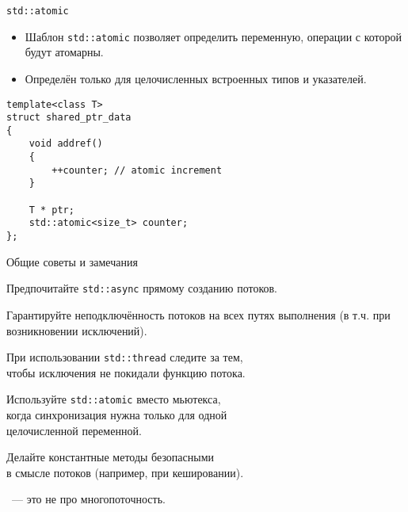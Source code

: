 \documentclass[aspectration=1610,t]{beamer}
\begin{document}
\begin{frame}[fragile]{\texttt{std::atomic}}
    \begin{itemize}
        \item Шаблон \texttt{std::atomic} позволяет определить переменную,
            операции с которой будут атомарны.

        \item Определён только для целочисленных встроенных типов и указателей.
    \end{itemize}

\begin{lstlisting}
template<class T>
struct shared_ptr_data 
{
    void addref() 
    {
        ++counter; // atomic increment
    }
    
    T * ptr;
    std::atomic<size_t> counter;
};
\end{lstlisting}
\end{frame}

\begin{frame}{Общие советы и замечания}
    \begin{itemize}
        \pitem Предпочитайте \texttt{std::async} прямому созданию потоков.

        \pitem Гарантируйте неподключённость потоков на всех путях выполнения (в т.ч. при возникновении исключений).

        \pitem При использовании \texttt{std::thread} следите за тем,\\ чтобы исключения не покидали функцию потока.

        \pitem Используйте \texttt{std::atomic} вместо мьютекса,\\
            когда синхронизация нужна только для одной\\ целочисленной
            переменной.
            
        \pitem Делайте константные методы безопасными\\ в смысле потоков
            (например, при кешировании).
            
        \pitem {}~--- это не про многопоточность.
    \end{itemize}
\end{frame}
\end{document}
